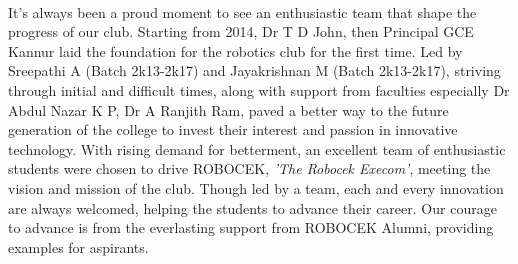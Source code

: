     \begin{figure}
        \centering
         \\
        \quad
    \end{figure}
    
    It's always been a proud moment to see an enthusiastic team that shape the progress of our club. Starting from 2014, Dr T D John, then Principal GCE Kannur laid the foundation for the robotics club for the first time. Led by Sreepathi A (Batch 2k13-2k17) and Jayakrishnan M (Batch 2k13-2k17), striving through initial and difficult times, along with support from faculties especially Dr Abdul Nazar K P, Dr A Ranjith Ram, paved a better way to the future generation of the college to invest their interest and passion in innovative technology. With rising demand for betterment, an excellent team of enthusiastic students were chosen to drive ROBOCEK, \textit{’The Robocek Execom’}, meeting the vision and mission of the club. Though led by a team, each and every innovation are always welcomed, helping the students to advance their career. Our courage to advance is from the everlasting support from ROBOCEK Alumni, providing examples for aspirants.

